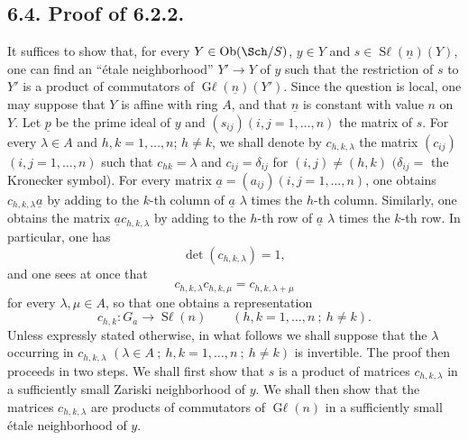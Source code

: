 \subsection*{6.4. Proof of 6.2.2.}
It suffices to show that, for every \(Y\in\operatorname{Ob}(\Sch/S)\), \(y\in Y\) and \(s\in\operatorname{S\ell}(\underline{n})(Y)\), one can find an ``étale neighborhood'' \(Y'\to Y\) of \(y\) such that the restriction of \(s\) to \(Y'\) is a product of commutators of \(\operatorname{G\ell}(\underline{n})(Y')\). Since the question is local, one may suppose that \(Y\) is affine with ring \(A\), and that \(\underline{n}\) is constant with value \(n\) on \(Y\). Let \(\underline{p}\) be the prime ideal of \(y\) and \((s_{ij})(i,j=1,\ldots,n)\) the matrix of \(s\). For every \(\lambda\in A\) and \(h, k=1,\ldots,n\); \(h\ne k\), we shall denote by \(c_{h,k,\lambda}\) the matrix \((c_{ij})\) \((i,j=1,\ldots,n)\) such that \(c_{hk}=\lambda\) and \(c_{ij}=\delta_{ij}\) for \((i,j)\ne(h,k)\) \((\delta_{ij}=\) the Kronecker symbol). For every matrix \(\underline{a}=(a_{ij})(i,j=1,\ldots,n)\), one obtains \(c_{h,k,\lambda}\underline{a}\) by adding to the \(k\)-th column of \(\underline{a}\) \(\lambda\) times the \(h\)-th column. Similarly, one obtains the matrix \(\underline{a}c_{h,k,\lambda}\) by adding to the \(h\)-th row of \(\underline{a}\) \(\lambda\) times the \(k\)-th row. In particular, one has
\[
 \det(c_{h,k,\lambda})=1,
\]
and one sees at once that
\begin{equation}\tag{6.3.1}
 c_{h,k,\lambda}c_{h,k,\mu}=c_{h,k,\lambda+\mu}
\end{equation}
for every \(\lambda,\mu\in A\), so that one obtains a representation
\[
 c_{h,k}:G_a\longrightarrow\operatorname{S\ell}(n)
 \qquad(h,k=1,\ldots,n\ ;\ h\ne k).
\]
Unless expressly stated otherwise, in what follows we shall suppose that the \(\lambda\) occurring in \(c_{h,k,\lambda}\) \((\lambda\in A\ ;\ h,k=1,\ldots,n\ ;\ h\ne k)\) is invertible.
The proof then proceeds in two steps. We shall first show that \(s\) is a product of matrices \(c_{h,k,\lambda}\) in a sufficiently small Zariski neighborhood of \(y\). We shall then show that the matrices \(c_{h,k,\lambda}\) are products of commutators of \(\operatorname{G\ell}(n)\) in a sufficiently small étale neighborhood of \(y\).

%

